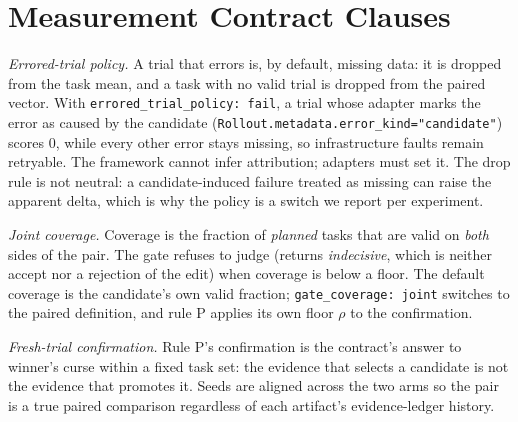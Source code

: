 \section{Measurement Contract Clauses}
\label{app:contract}

\emph{Errored-trial policy.}
A trial that errors is, by default, missing data: it is dropped from the task mean, and a task with no valid trial is
dropped from the paired vector. With \texttt{errored\_\allowbreak trial\_\allowbreak policy: fail}, a trial whose adapter marks the error as
caused by the candidate (\texttt{Rollout.metadata.error\_\allowbreak kind="candidate"}) scores $0$, while every other error stays
missing, so infrastructure faults remain retryable. The framework cannot infer attribution; adapters must set it.
The drop rule is not neutral: a candidate-induced failure treated as missing can raise the apparent delta, which is why
the policy is a switch we report per experiment.

\emph{Joint coverage.}
Coverage is the fraction of \emph{planned} tasks that are valid on \emph{both} sides of the pair. The gate refuses to
judge (returns \emph{indecisive}, which is neither accept nor a rejection of the edit) when coverage is below a floor.
The default coverage is the candidate's own valid fraction; \texttt{gate\_\allowbreak coverage: joint} switches to the paired
definition, and rule P applies its own floor $\rho$ to the confirmation.

\emph{Fresh-trial confirmation.}
Rule P's confirmation is the contract's answer to winner's curse within a fixed task set: the evidence that selects a
candidate is not the evidence that promotes it. Seeds are aligned across the two arms so the pair is a true paired
comparison regardless of each artifact's evidence-ledger history.

